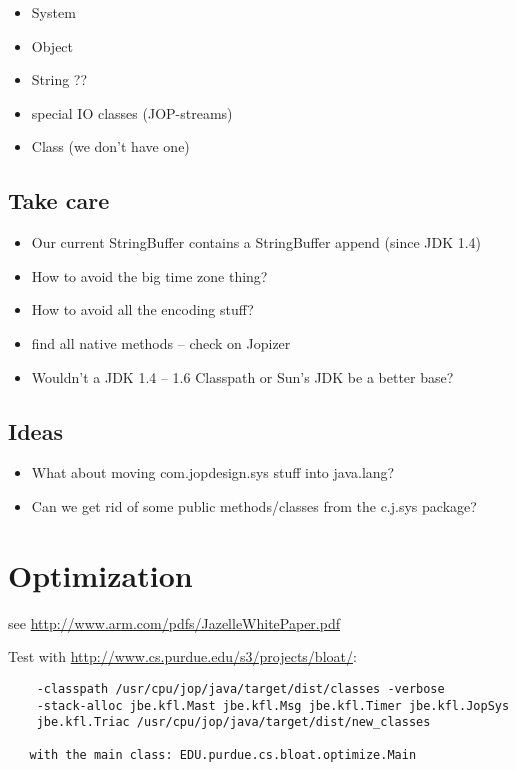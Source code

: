 \documentclass[a4paper,12pt]{scrartcl}
\begin{document}
\begin{itemize}
  \item System
  \item Object
  \item String ??
  \item special IO classes (JOP-streams)
  \item Class (we don't have one)
\end{itemize}

\subsection{Take care}

\begin{itemize}
  \item Our current StringBuffer contains a StringBuffer append
      (since JDK 1.4)
  \item How to avoid the big time zone thing?
  \item How to avoid all the encoding stuff?
  \item find all native methods -- check on Jopizer
  \item Wouldn't a JDK 1.4 -- 1.6 Classpath or Sun's JDK be a
      better base?
\end{itemize}

\subsection{Ideas}

\begin{itemize}
  \item What about moving com.jopdesign.sys stuff into java.lang?
  \item Can we get rid of some public methods/classes from the
      c.j.sys package?
\end{itemize}



\section{Optimization}

see \url{http://www.arm.com/pdfs/JazelleWhitePaper.pdf}

Test with \url{http://www.cs.purdue.edu/s3/projects/bloat/}:

\begin{verbatim}
    -classpath /usr/cpu/jop/java/target/dist/classes -verbose
    -stack-alloc jbe.kfl.Mast jbe.kfl.Msg jbe.kfl.Timer jbe.kfl.JopSys
    jbe.kfl.Triac /usr/cpu/jop/java/target/dist/new_classes

   with the main class: EDU.purdue.cs.bloat.optimize.Main
\end{verbatim}
\end{document}
